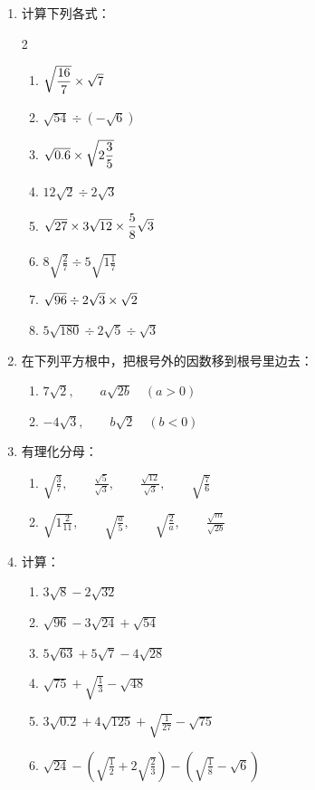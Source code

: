 \begin{enumerate}
\item 计算下列各式：
\begin{multicols}{2}
\begin{enumerate}
    \item $\sqrt{\dfrac{16}{7}}\times \sqrt{7}$
    \item $\sqrt{54}\div \left(-\sqrt{6}\right)$
    \item $\sqrt{0.6}\times \sqrt{2\dfrac{3}{5}}$
    \item $12\sqrt{2}\div 2\sqrt{3}$
    \item $\sqrt{27}\times 3\sqrt{12}\times \dfrac{5}{8}\sqrt{3}$
    \item $8\sqrt{\frac{2}{7}}\div 5\sqrt{1\frac{1}{7}}$
    \item $\sqrt{96}\div 2\sqrt{3}\times \sqrt{2}$
    \item $5\sqrt{180}\div 2\sqrt{5}\div \sqrt{3}$
\end{enumerate}
\end{multicols}

\item 在下列平方根中，把根号外的因数移到根号里边去：
\begin{enumerate}
    \item $7\sqrt{2},\qquad a\sqrt{2b}\quad (a>0)$
    \item $-4\sqrt{3},\qquad b\sqrt{2}\quad (b<0)$
\end{enumerate}

\item 有理化分母：
\begin{enumerate}
    \item $\sqrt{\frac{3}{7}},\qquad \frac{\sqrt{5}}{\sqrt{3}},\qquad \frac{\sqrt{12}}{\sqrt{3}},\qquad \sqrt{\frac{7}{6}}$
    \item $\sqrt{1\frac{2}{11}},\qquad \sqrt{\frac{a}{5}},\qquad \sqrt{\frac{2}{a}},\qquad \frac{\sqrt{m}}{\sqrt{2b}} $
\end{enumerate}

\item 计算：
\begin{enumerate}
    \item $3\sqrt{8}-2\sqrt{32}$
    \item $\sqrt{96}-3\sqrt{24}+\sqrt{54}$
    \item $5\sqrt{63}+5\sqrt{7}-4\sqrt{28}$
    \item $\sqrt{75}+\sqrt{\frac{1}{3}}-\sqrt{48}$
    \item $3\sqrt{0.2}+4\sqrt{125}+\sqrt{\frac{1}{27}}-\sqrt{75}$
    \item $\sqrt{24}-\left(\sqrt{\frac{1}{2}}+2\sqrt{\frac{2}{3}}\right)-\left(\sqrt{\frac{1}{8}}-\sqrt{6}\right)$
\end{enumerate}


\end{enumerate}
